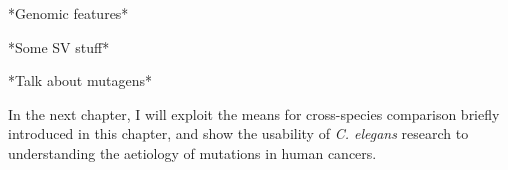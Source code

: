 *Genomic features*

*Some SV stuff*

*Talk about mutagens*

In the next chapter, I will exploit the means for cross-species comparison briefly introduced in this chapter, and show the usability of \textit{C. elegans} research to understanding the aetiology of mutations in human cancers.




